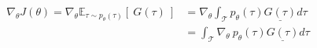 \begin{align}
\nabla_\theta J(\theta) = \nabla_\theta \mathbb{E}_{\tau \sim p_{\theta}(\tau)} \left\lbrack\ G(\tau) \ \right\rbrack
&= \nabla_\theta \int_{\mathcal{T}} p_\theta(\tau) \underline{G(\tau)} d\tau \\
&= \int_{\mathcal{T}} \nabla_\theta\ p_\theta(\tau) \underline{G(\tau)} d\tau
\end{align}